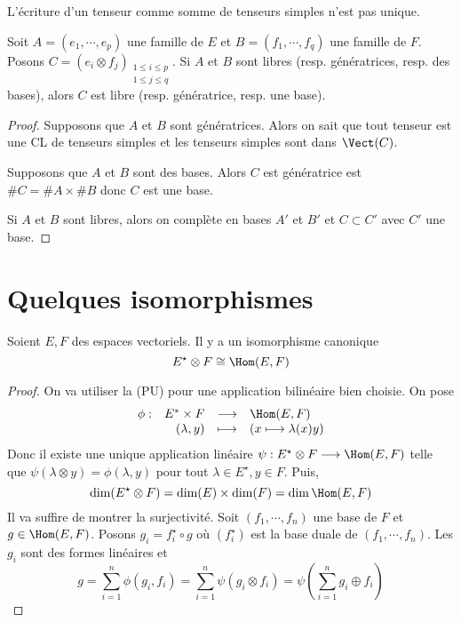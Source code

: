 \begin{rem}
L'écriture d'un tenseur comme somme de tenseurs simples n'est pas unique.
\end{rem}

\begin{prop}
    Soit $A=(e_1, \cdots , e_p)$ une famille de $E$ et  $B=(f_1, \cdots , f_q)$ une famille de $F$. Posons  $C=(e_i\otimes f_j)_{\substack{1\leq i\leq p\\1\leq j\leq q}}$. Si $A$ et  $B$ sont libres (resp. génératrices, resp. des bases), alors  $C$ est libre (resp. génératrice, resp. une base).
\end{prop}

\begin{proof}
    Supposons que $A$ et  $B$ sont génératrices. Alors on sait que tout tenseur est une CL de tenseurs simples et les tenseurs simples sont dans  $\Vect(C)$.

    Supposons que $A$ et  $B$ sont des bases. Alors  $C$ est génératrice est  $\#C=\#A\times \#B$ donc  $C$ est une base.

    Si  $A$ et  $B$ sont libres, alors on complète en bases  $A'$ et  $B'$ et  $C\subset C'$ avec  $C'$ une base.
\end{proof}

\section{Quelques isomorphismes}

\begin{prop}
Soient $E, F$ des espaces vectoriels. Il y a un isomorphisme canonique \[
    E^\star \otimes F\cong \Hom(E, F)
\] 
\end{prop}

\begin{proof}
    On va utiliser la (PU) pour une application bilinéaire bien choisie. On pose \[
    \begin{array}{rrcl}
        \phi:& E^* \times F& \longrightarrow & \Hom(E, F) \\
             & (\lambda, y) & \longmapsto & \displaystyle (x \longmapsto \lambda(x)y)
    \end{array}
    \] 
    Donc il existe une unique application linéaire $\psi : E^\star \otimes F \longrightarrow \Hom(E, F)$ telle que $\psi(\lambda\otimes y)=\phi(\lambda, y)$ pour tout  $\lambda \in  E^\star, y \in  F$. Puis, \[
        \dim(E^\star\otimes F)=\dim (E)\times \dim (F)=\dim\Hom(E, F)
    \] 
    Il va suffire de montrer la surjectivité. Soit $(f_1, \cdots , f_n)$ une base de $F$ et  $g \in \Hom(E, F)$. Posons $g_i=f_i^\star\circ g$ où $(f_i^\star)$ est la base duale de  $(f_1, \cdots , f_n)$. Les $g_i$ sont des formes linéaires et \[
        g=\sum_{i=1}^n \phi(g_i, f_i)=\sum_{i=1}^n\psi(g_i\otimes f_i)=\psi\left(\sum_{i=1}^n g_i\oplus f_i\right)
    \] 
\end{proof}

